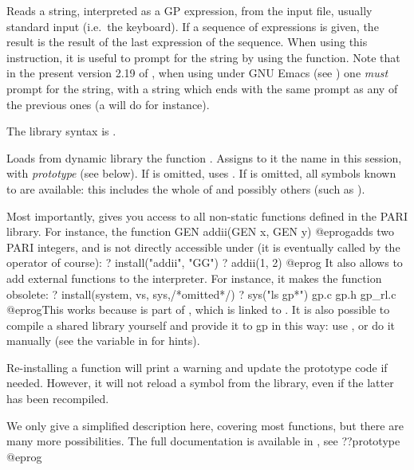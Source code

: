 \label{se:input}
Reads a string, interpreted as a GP expression,
from the input file, usually standard input (i.e.~the keyboard). If a
sequence of expressions is given, the result is the result of the last
expression of the sequence. When using this instruction, it is useful to
prompt for the string by using the  function. Note that in the
present version 2.19 of , when using  under GNU Emacs (see
) one \emph{must} prompt for the string, with a string
which ends with the same prompt as any of the previous ones (a 
will do for instance).

The library syntax is .

\label{se:install}
Loads from dynamic library  the function . Assigns to it
the name  in this  session, with \emph{prototype}
 (see below). If  is omitted, uses .
If  is omitted, all symbols known to  are available: this
includes the whole of  and possibly others (such as
).

Most importantly,  gives you access to all non-static functions
defined in the PARI library. For instance, the function
\bprog
  GEN addii(GEN x, GEN y)
@eprog\noindent adds two PARI integers, and is not directly accessible under
 (it is eventually called by the \kbd{+} operator of course):
\bprog
? install("addii", "GG")
? addii(1, 2)
@eprog\noindent
It also allows to add external functions to the  interpreter.
For instance, it makes the function  obsolete:
\bprog
? install(system, vs, sys,/*omitted*/)
? sys("ls gp*")
gp.c            gp.h            gp_rl.c
@eprog\noindent This works because  is part of ,
which is linked to . It is also possible to compile a shared library
yourself and provide it to gp in this way: use , or do it manually
(see the  variable in  for hints).

Re-installing a function will print a warning and update the prototype code
if needed. However, it will not reload a symbol from the library, even if the
latter has been recompiled.

 We only give a simplified description here, covering
most functions, but there are many more possibilities. The full documentation
is available in , see
\bprog
  ??prototype
@eprog


